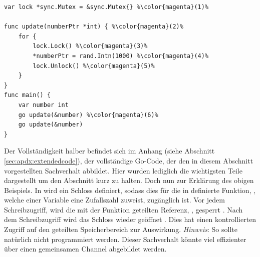 \begin{minipage}[c]{\linewidth}
\begin{lstlisting}[style=goMono,caption={Beispiel \mono{sync.Mutex}},label={lst:go:sync:concurrency:ex4}]
var lock *sync.Mutex = &sync.Mutex{} %\color{magenta}(1)%

func update(numberPtr *int) { %\color{magenta}(2)%
    for {
        lock.Lock() %\color{magenta}(3)%
        *numberPtr = rand.Intn(1000) %\color{magenta}(4)%
        lock.Unlock() %\color{magenta}(5)%
    }
}
func main() {
    var number int
    go update(&number) %\color{magenta}(6)%
    go update(&number)
}
\end{lstlisting}
\end{minipage}
Der Vollständigkeit halber befindet sich im Anhang (siehe Abschnitt \ref{sec:apdx:extendedcode}), der vollständige Go-Code, der den in diesem Abschnitt vorgestellten Sachverhalt abbildet. Hier wurden lediglich die wichtigsten Teile dargestellt um den Abschnitt kurz zu halten. Doch nun zur Erklärung des obigen Beispiels. In  wird ein Schloss definiert, sodass dies für die in  definierte Funktion, , welche einer Variable eine Zufallszahl  zuweist, zugänglich ist. Vor jedem Schreibzugriff, wird die mit der Funktion geteilten Referenz, , gesperrt . Nach dem Schreibzugriff wird das Schloss wieder geöffnet . Dies hat einen kontrollierten Zugriff auf den geteilten Speicherbereich zur Auswirkung. \textit{Hinweis}: So sollte natürlich nicht programmiert werden. Dieser Sachverhalt könnte viel effizienter über einen gemeinsamen Channel abgebildet werden.    

\newpage
